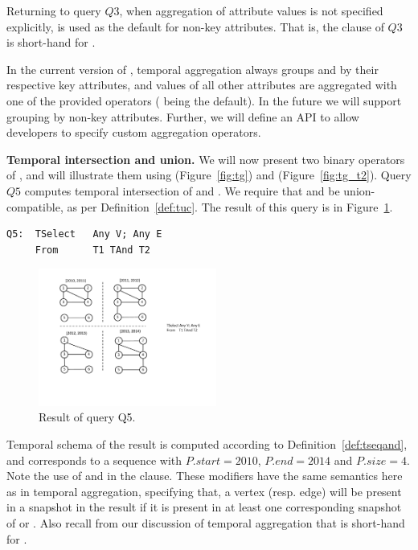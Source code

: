 Returning to query $Q3$, when aggregation of attribute values is not
specified explicitly,  is used as the default for non-key
attributes.  That is, the  clause of $Q3$ is short-hand
for  
.

In the current version of \ql, temporal aggregation always groups
 and  by their respective key attributes, and values
of all other attributes are aggregated with one of the provided
operators ( being the default).  In the future we will
support grouping by non-key attributes.  Further, we will define an
API to allow developers to specify custom aggregation operators.

{\bf Temporal intersection and union.} We will now present two binary
operators of \ql, and will illustrate them using 
(Figure~\ref{fig:tg}) and  (Figure~\ref{fig:tg_t2}).  Query
$Q5$ computes temporal intersection of  and .  We
require that  and  be union-compatible, as per
Definition~\ref{def:tuc}.  The result of this query is in
Figure~\ref{fig:q5}.

\begin{small}
\begin{verbatim}
Q5:  TSelect   Any V; Any E
     From      T1 TAnd T2
\end{verbatim}
\end{small}

\begin{figure}
\centering
\includegraphics[width=2.3in]{figs/q5.pdf}
\caption{Result of query Q5.}
\label{fig:q5}
\end{figure}

Temporal schema of the result is computed according to
Definition~\ref{def:tseqand}, and corresponds to a sequence with
$P.start = 2010$, $P.end=2014$ and $P.size=4$.  Note the use of
 and  in the  clause.  These
modifiers have the same semantics here as in temporal aggregation,
specifying that, a vertex (resp. edge) will be present in a snapshot
in the result if it is present in at least one corresponding snapshot
of  or .  Also recall from our discussion of
temporal aggregation that  is short-hand
for .

